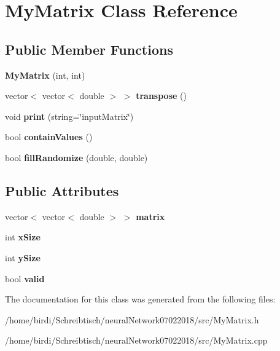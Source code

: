 \hypertarget{classMyMatrix}{}\section{My\+Matrix Class Reference}
\label{classMyMatrix}
\subsection*{Public Member Functions}
\begin{DoxyCompactItemize}
\item 
\mbox{\label{classMyMatrix_a811606c099648221c9be335142722d17}} 
{\bfseries My\+Matrix} (int, int)
\item 
\mbox{\label{classMyMatrix_a9db5f0607f792c6341382024c7011bad}} 
vector$<$ vector$<$ double $>$ $>$ {\bfseries transpose} ()
\item 
\mbox{\label{classMyMatrix_afc06f3e1b883d77f160ac899741092ce}} 
void {\bfseries print} (string=\char`\"{}input\+Matrix\char`\"{})
\item 
\mbox{\label{classMyMatrix_af6921c1fad18bf724e37233ef479167d}} 
bool {\bfseries contain\+Values} ()
\item 
\mbox{\label{classMyMatrix_a0cc6b8121b67175d6727ecdd0dc07619}} 
bool {\bfseries fill\+Randomize} (double, double)
\end{DoxyCompactItemize}
\subsection*{Public Attributes}
\begin{DoxyCompactItemize}
\item 
\mbox{\label{classMyMatrix_aea4fad6ef190672cc68781316e7fb172}} 
vector$<$ vector$<$ double $>$ $>$ {\bfseries matrix}
\item 
\mbox{\label{classMyMatrix_abfdfa4ffb0a9bc1cec4505810b8f5072}} 
int {\bfseries x\+Size}
\item 
\mbox{\label{classMyMatrix_adb6a279a81501efc9ec05259390f1099}} 
int {\bfseries y\+Size}
\item 
\mbox{\label{classMyMatrix_a1a9031bbb730cb75d5438b72eaeb2010}} 
bool {\bfseries valid}
\end{DoxyCompactItemize}


The documentation for this class was generated from the following files\+:\begin{DoxyCompactItemize}
\item 
/home/birdi/\+Schreibtisch/neural\+Network07022018/src/My\+Matrix.\+h\item 
/home/birdi/\+Schreibtisch/neural\+Network07022018/src/My\+Matrix.\+cpp\end{DoxyCompactItemize}
